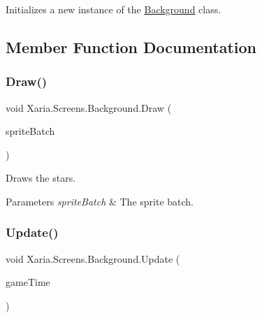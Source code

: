 Initializes a new instance of the \hyperlink{classXaria_1_1Screens_1_1Background}{Background} class. 



\subsection{Member Function Documentation}
\mbox{\label{classXaria_1_1Screens_1_1Background_ad324cde0b40966085c72a167f9ef940e}} 
\subsubsection{\texorpdfstring{Draw()}{Draw()}}
{\footnotesize\ttfamily void Xaria.\+Screens.\+Background.\+Draw (\begin{DoxyParamCaption}\item[{ref Sprite\+Batch}]{sprite\+Batch }\end{DoxyParamCaption})\hspace{0.3cm}{\ttfamily [inline]}}



Draws the stars. 


\begin{DoxyParams}{Parameters}
{\em sprite\+Batch} & The sprite batch.\\
\hline
\end{DoxyParams}
\mbox{\label{classXaria_1_1Screens_1_1Background_a5008a9ab39ee86f901e965f9121b08e2}} 
\subsubsection{\texorpdfstring{Update()}{Update()}}
{\footnotesize\ttfamily void Xaria.\+Screens.\+Background.\+Update (\begin{DoxyParamCaption}\item[{Game\+Time}]{game\+Time }\end{DoxyParamCaption})\hspace{0.3cm}{\ttfamily [inline]}}




